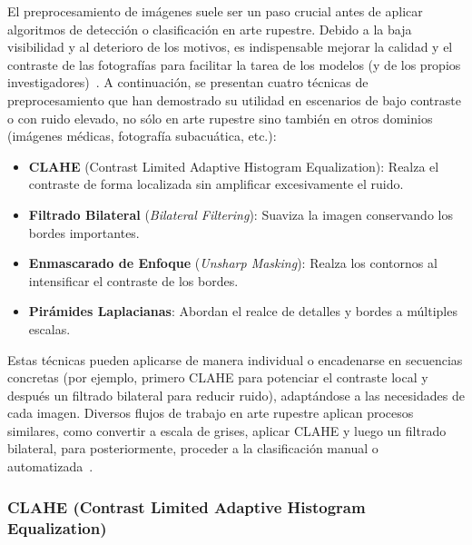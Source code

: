 El preprocesamiento de imágenes suele ser un paso crucial antes de aplicar algoritmos de detección o clasificación en arte rupestre.
Debido a la baja visibilidad y al deterioro de los motivos, es indispensable mejorar la calidad y el contraste de las fotografías para facilitar la tarea de los modelos (y de los propios investigadores)~\cite{li2022}.
A continuación, se presentan cuatro técnicas de preprocesamiento que han demostrado su utilidad en escenarios de bajo contraste o con ruido elevado, no sólo en arte rupestre sino también en otros dominios (imágenes médicas, fotografía subacuática, etc.):

\begin{itemize}
\item \textbf{CLAHE} (Contrast Limited Adaptive Histogram Equalization): Realza el contraste de forma localizada sin amplificar excesivamente el ruido.
\item \textbf{Filtrado Bilateral} (\textit{Bilateral Filtering}): Suaviza la imagen conservando los bordes importantes.
\item \textbf{Enmascarado de Enfoque} (\textit{Unsharp Masking}): Realza los contornos al intensificar el contraste de los bordes.
\item \textbf{Pirámides Laplacianas}: Abordan el realce de detalles y bordes a múltiples escalas.
\end{itemize}

Estas técnicas pueden aplicarse de manera individual o encadenarse en secuencias concretas (por ejemplo, primero CLAHE para potenciar el contraste local y después un filtrado bilateral para reducir ruido), adaptándose a las necesidades de cada imagen.
Diversos flujos de trabajo en arte rupestre aplican procesos similares, como convertir a escala de grises, aplicar CLAHE y luego un filtrado bilateral, para posteriormente, proceder a la clasificación manual o automatizada~\cite{xiao2020,li2022}.

\subsubsection{CLAHE (Contrast Limited Adaptive Histogram Equalization)}

